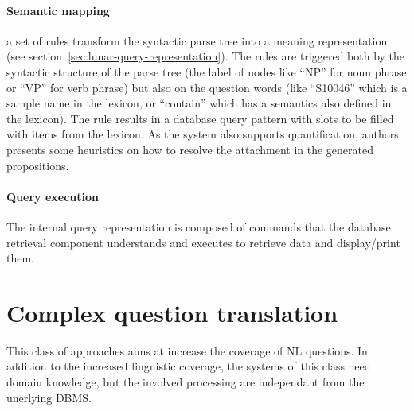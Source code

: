 \documentclass[10pt,journal,letterpaper,compsoc]{IEEEtran}
\begin{document}
\paragraph{Semantic mapping}a set of rules transform the syntactic parse
tree into a meaning representation (see
section~\ref{sec:lunar-query-representation}).
The rules are triggered both by the syntactic structure of the parse tree (the
label of nodes like ``NP'' for noun phrase or ``VP'' for verb phrase) but also
on the question words (like ``S10046'' which is a sample name in the lexicon,
or ``contain'' which has a semantics also defined in the lexicon).
The rule results in a database query pattern with slots to be filled with items
from the lexicon.
As the system also supports quantification, authors presents some heuristics on
how to resolve the attachment in the generated propositions.

\paragraph{Query execution}The internal query representation is composed of
commands that the database retrieval component understands and executes to
retrieve data and display/print them.














\section{Complex question translation}
\label{sec:complex-question}
This class of approaches aims at increase the coverage of NL questions.
In addition to the increased linguistic coverage, the systems of this class need
domain knowledge, but the involved processing are independant from the unerlying
DBMS.
\end{document}
